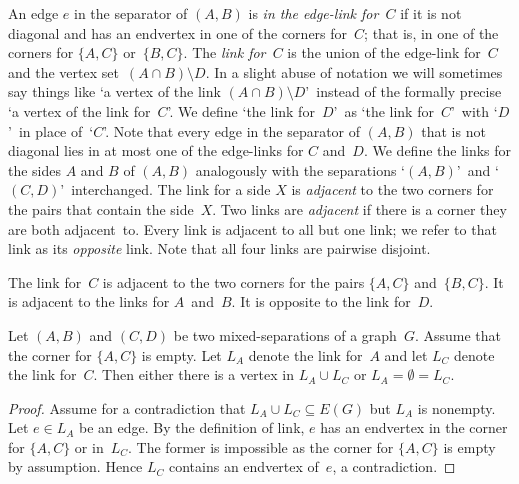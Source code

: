 \documentclass{aic}
\newcommand{\se}{\subseteq}
\theoremstyle{plain}
\theoremstyle{definition}
\theoremstyle{plain}
\theoremstyle{plain}
\newcommand{\sm}{\setminus}
\begin{document}
An edge $e$ in the separator of $(A,B)$ is \emph{in the edge-link for~$C$} if it is not 
diagonal and has an endvertex in one of the corners for~$C$; that is, in one of the corners for 
$\{A,C\}$ or~$\{B,C\}$.
The \emph{link for~$C$} is the union of the edge-link for~$C$ and the vertex set~$(A\cap B)\sm D$. 
In a slight abuse of notation we will sometimes say things like \lq a vertex of the link $(A\cap B)\sm D$\rq\ instead of the formally precise \lq a vertex of the link for~$C$\rq.
We define \lq the link for~$D$\rq\ as \lq the link for~$C$\rq\ with \lq$D$\rq\ in place of~\lq $C$\rq. 
Note that every edge in the separator of $(A,B)$ that is not diagonal lies in at most one of the edge-links for $C$ and~$D$. 
We define the links for the sides $A$ and $B$ of $(A,B)$ analogously with the 
separations \lq $(A,B)$\rq\ and \lq $(C,D)$\rq\ interchanged.
The link for a side $X$ is \emph{adjacent} to the two corners for the pairs that contain the side~$X$. 
Two links are \emph{adjacent} if there is a corner they are both adjacent~to. 
Every link is adjacent to all but one link; we refer to that link as its \emph{opposite} link.
Note that all four links are pairwise disjoint.

\begin{eg}
The link for~$C$ is adjacent to the two corners for the pairs $\{A,C\}$ and~$\{B,C\}$. 
It is adjacent to the links for $A$~and~$B$. 
It is opposite to the link for~$D$. 
\end{eg}

\begin{lem}\label{EdgesAdjacentLinks}
Let $(A,B)$ and $(C,D)$ be two mixed-separations of a graph~$G$.
Assume that the corner for $\{A,C\}$ is empty.
Let $L_A$ denote the link for~$A$ and let $L_C$ denote the link for~$C$.
Then either there is a vertex in $L_A\cup L_C$ or $L_A=\emptyset=L_C$.
\end{lem}
\begin{proof}
    Assume for a contradiction that $L_A\cup L_C\se E(G)$ but $L_A$ is nonempty.
    Let $e\in L_A$ be an edge.
    By the definition of link, $e$ has an endvertex in the corner for $\{A,C\}$ or in~$L_C$.
    The former is impossible as the corner for $\{A,C\}$ is empty by assumption.
    Hence $L_C$ contains an endvertex of~$e$, a contradiction.
\end{proof}
\end{document}

